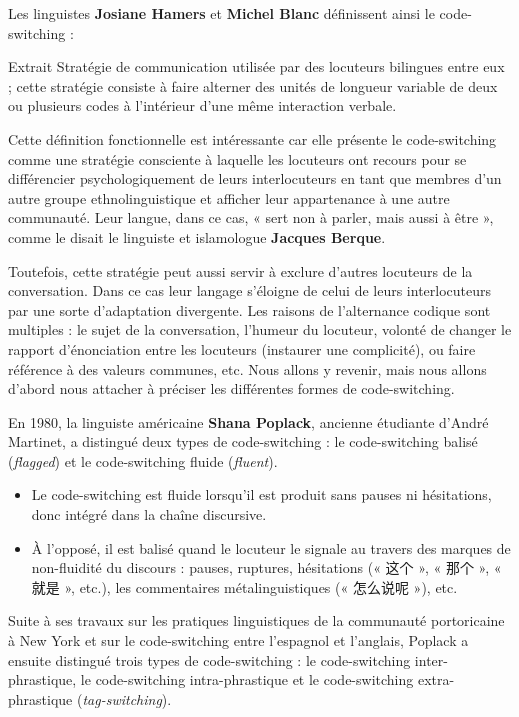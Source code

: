 Les linguistes \textbf{Josiane Hamers} et \textbf{Michel Blanc} définissent ainsi le code-switching :

\begin{lecture}{Extrait}
Stratégie de communication utilisée par des locuteurs bilingues entre eux ; cette stratégie consiste à faire alterner des unités de longueur variable de deux ou plusieurs codes à l’intérieur d’une même interaction verbale.
\end{lecture}

Cette définition fonctionnelle est intéressante car elle présente le code-switching comme une stratégie consciente à laquelle les locuteurs ont recours pour se différencier psychologiquement de leurs interlocuteurs en tant que membres d’un autre groupe ethnolinguistique et afficher leur appartenance à une autre communauté. Leur langue, dans ce cas, « sert non à parler, mais aussi à être », comme le disait le linguiste et islamologue \textbf{Jacques Berque}.

Toutefois, cette stratégie peut aussi servir à exclure d’autres locuteurs de la conversation. Dans ce cas leur langage s’éloigne de celui de leurs interlocuteurs par une sorte d’adaptation divergente. Les raisons de l’alternance codique sont multiples : le sujet de la conversation, l’humeur du locuteur, volonté de changer le rapport d’énonciation entre les locuteurs (instaurer une complicité), ou faire référence à des valeurs communes, etc. Nous allons y revenir, mais nous allons d’abord nous attacher à préciser les différentes formes de code-switching.

En 1980, la linguiste américaine \textbf{Shana Poplack}, ancienne étudiante d’André Martinet, a distingué deux types de code-switching : le code-switching balisé (\textit{flagged}) et le code-switching fluide
(\textit{fluent}).
\begin{itemize}
\item Le code-switching est fluide lorsqu’il est produit sans pauses ni hésitations, donc intégré dans la chaîne discursive.
\item À l’opposé, il est balisé quand le locuteur le signale au travers des marques de non-fluidité du discours : pauses, ruptures, hésitations (« 这个 », « 那个 », « 就是 », etc.), les commentaires métalinguistiques (« 怎么说呢 »), etc.
\end{itemize}

Suite à ses travaux sur les pratiques linguistiques de la communauté portoricaine à New York et sur le code-switching entre l’espagnol et l’anglais, Poplack a ensuite distingué trois types de code-switching : le code-switching inter-phrastique, le code-switching intra-phrastique et le code-switching extra-phrastique (\textit{tag-switching}).

